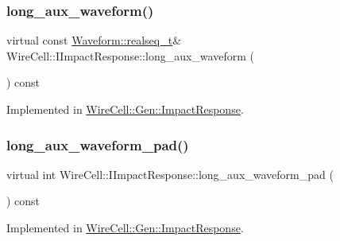 \subsubsection{\texorpdfstring{long\+\_\+aux\+\_\+waveform()}{long\_aux\_waveform()}}
{\footnotesize\ttfamily virtual const \hyperlink{namespace_wire_cell_1_1_waveform_a479175e541c8545e87cd8063b74b6956}{Waveform\+::realseq\+\_\+t}\& Wire\+Cell\+::\+I\+Impact\+Response\+::long\+\_\+aux\+\_\+waveform (\begin{DoxyParamCaption}{ }\end{DoxyParamCaption}) const\hspace{0.3cm}{\ttfamily [pure virtual]}}



Implemented in \hyperlink{class_wire_cell_1_1_gen_1_1_impact_response_ad722252b3658fea7cfc38d1d1dee3787}{Wire\+Cell\+::\+Gen\+::\+Impact\+Response}.

\mbox{\label{class_wire_cell_1_1_i_impact_response_a2f9b7f14cf42e37639c193238f357c43}} 
\subsubsection{\texorpdfstring{long\+\_\+aux\+\_\+waveform\+\_\+pad()}{long\_aux\_waveform\_pad()}}
{\footnotesize\ttfamily virtual int Wire\+Cell\+::\+I\+Impact\+Response\+::long\+\_\+aux\+\_\+waveform\+\_\+pad (\begin{DoxyParamCaption}{ }\end{DoxyParamCaption}) const\hspace{0.3cm}{\ttfamily [pure virtual]}}



Implemented in \hyperlink{class_wire_cell_1_1_gen_1_1_impact_response_a0ea37ecd9dfc58b77c11dd8599128f14}{Wire\+Cell\+::\+Gen\+::\+Impact\+Response}.

\mbox{\label{class_wire_cell_1_1_i_impact_response_ade63911c39df242ecc8b6858916b0fc8}} 
